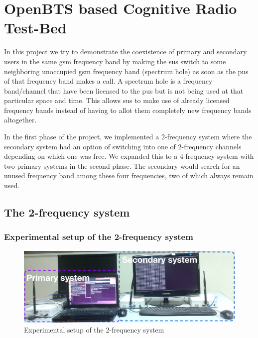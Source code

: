 \chapter{OpenBTS based Cognitive Radio Test-Bed}

In this project we try to demonstrate the coexistence of primary and secondary
users in the same \gls{gsm} frequency band by making the \glspl{su} switch to 
some neighboring unoccupied \gls{gsm} frequency band (spectrum hole) as soon as the 
\glspl{pu} of that frequency band makes a call. A spectrum hole is a 
frequency band/channel that have been licensed to the \glspl{pu} but is not 
being used at that particular space and time. This allows \glspl{su} to 
make use of already licensed frequency bands instead of having to allot them 
completely new frequency bands altogether.

In the first phase of the project, we implemented a 2-frequency system where
the secondary system had an option of switching into one of 2-frequency 
channels depending on which one was free. We expanded this to a 4-frequency
system with two primary systems in the second phase. The secondary would 
search for an unused frequency band among these four frequencies, two of which
always remain used.

\section{The 2-frequency system}
\subsection{Experimental setup of the 2-frequency system}

\begin{figure}
\centering
\includegraphics[width=1\textwidth]{../images/freq2}
\caption[Experimental setup, 2-frequency system]{Experimental setup of the 
2-frequency system}
\label{freq2}
\end{figure}



